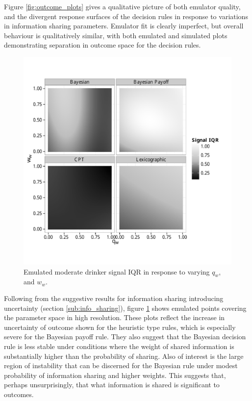 Figure \ref{fig:outcome_plots} gives a qualitative picture of both emulator quality, and the divergent response surfaces of the decision rules in response to variations in information sharing parameters. Emulator fit is clearly imperfect, but overall behaviour is qualitatively similar, with both emulated and simulated plots demonstrating separation in outcome space for the decision rules.

\begin{figure}[H]
\begin{adjustbox}{center}\includegraphics[width=0.8\linewidth]{figures/unfixed_emu_sig_iqr}\end{adjustbox}
\caption{Emulated moderate drinker signal IQR in response to varying \(q_{w}\), and \(w_{w}\).}
\label{fig:emulated_sharing_iqr}
\end{figure}

Following from the suggestive results for information sharing introducing uncertainty (section \ref{sub:info_sharing}), figure \ref{fig:emulated_sharing_iqr} shows emulated points covering the parameter space in high resolution. These plots reflect the increase in uncertainty of outcome shown for the heuristic type rules, which is especially severe for the Bayesian payoff rule. They also suggest that the Bayesian decision rule is less stable under conditions where the weight of shared information is substantially higher than the probability of sharing. Also of interest is the large region of instability that can be discerned for the Bayesian rule under modest probability of information sharing and higher weights. This suggests that, perhaps unsurprisingly, that what information is shared is significant to outcomes.

